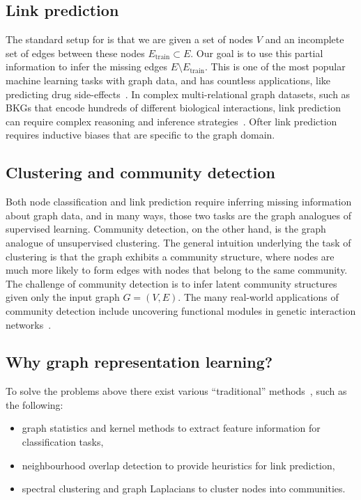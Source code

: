 \subsection{Link prediction}
The standard setup for  is that we are given a set of nodes $V$ and an incomplete set of edges between these nodes $E_\text{train} \subset E$. Our goal is to use this partial information to infer the missing edges $E \setminus E_\text{train}$. This is one of the most popular machine learning tasks with graph data, and has countless applications, like predicting drug side-effects~\cite{Zitnik2018ModelingPolypharmacySideEffectsGCN}. In complex multi-relational graph datasets, such as BKGs that encode hundreds of different biological interactions, link prediction can require complex reasoning and inference strategies~\cite{Nickel2015ReviewRelationalMLKG}. Ofter link prediction requires inductive biases that are specific to the graph domain.

\subsection{Clustering and community detection}
Both node classification and link prediction require inferring missing information about graph data, and in many ways, those two tasks are the graph analogues of supervised learning. Community detection, on the other hand, is the graph analogue of unsupervised clustering. The general intuition underlying the task of clustering is that the graph exhibits a community structure, where nodes are much more likely to form edges with nodes that belong to the same community. The challenge of community detection is to infer latent community structures given only the input graph $G = (V, E)$. The many real-world applications of community detection include uncovering functional modules in genetic interaction networks~\cite{Agrawal2018LargeScaleAnalysisDiseasePathwaysHumanInteractome}.

\subsection{Why graph representation learning?}
To solve the problems above there exist various ``traditional'' methods~\cite{Hamilton2020GraphRL}, such as the following:
\begin{itemize}
    \item graph statistics and kernel methods to extract feature information for classification tasks,
    \item neighbourhood overlap detection to provide heuristics for link prediction,
    \item spectral clustering and graph Laplacians to cluster nodes into communities.
\end{itemize}


